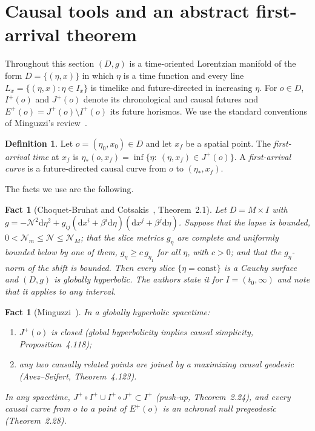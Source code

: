 \documentclass[aip,jmp,amsmath,amssymb,reprint]{revtex4-2}
\newcommand{\dd}{\mathrm{d}}
\theoremstyle{plain}
\newtheorem{fact}[proposition]{Fact}
\theoremstyle{definition}
\newtheorem{definition}[proposition]{Definition}
\begin{document}
\section{Causal tools and an abstract first-arrival theorem}
\label{sec:causal}
Throughout this section $(D,g)$ is a time-oriented Lorentzian manifold of the form
$D=\{(\eta,x)\}$ in which $\eta$ is a time function and every line
$L_x=\{(\eta,x):\eta\in I_x\}$ is timelike and future-directed in increasing $\eta$. For
$o\in D$, $I^+(o)$ and $J^+(o)$ denote its chronological and causal futures and
$E^+(o)=J^+(o)\setminus I^+(o)$ its future horismos. We use the standard
conventions of Minguzzi's review~\cite{Minguzzi2019LRR}.

\begin{definition}
Let $o=(\eta_0,x_0)\in D$ and let $x_f$ be a spatial point. The \emph{first-arrival
time} at $x_f$ is
$\eta_*(o,x_f)=\inf\{\eta:\ (\eta,x_f)\in J^+(o)\}$. A \emph{first-arrival curve} is a
future-directed causal curve from $o$ to $(\eta_*,x_f)$.
\end{definition}

The facts we use are the following.

\begin{fact}[Choquet-Bruhat and Cotsakis~\cite{ChoquetBruhatCotsakis2002}, Theorem~2.1]
\label{fact:CBC}
Let $D=M\times I$ with $g=-\mathcal N^2\dd\eta^2+g_{ij}(\dd x^i+\beta^i\dd\eta)(\dd x^j+\beta^j\dd\eta)$.
Suppose that the lapse is bounded, $0<\mathcal N_m\le\mathcal N\le\mathcal N_M$; that the
slice metrics $g_\eta$ are complete and uniformly bounded below by one of them,
$g_\eta\ge c\,g_{\eta_1}$ for all $\eta$, with $c>0$; and that the $g_\eta$-norm of the shift is
bounded. Then every slice $\{\eta=\mathrm{const}\}$ is a Cauchy surface and $(D,g)$ is
globally hyperbolic. The authors state it for $I=(t_0,\infty)$ and note that it applies
to any interval.
\end{fact}

\begin{fact}[Minguzzi~\cite{Minguzzi2019LRR}]\label{fact:minguzzi}
In a globally hyperbolic spacetime:
\begin{enumerate}
\item $J^+(o)$ is closed (global hyperbolicity implies causal simplicity,
  Proposition~4.118);
\item any two causally related points are joined by a maximizing causal geodesic
  (Avez--Seifert, Theorem~4.123).
\end{enumerate}
In any spacetime, $J^+\circ I^+\cup I^+\circ J^+\subset I^+$ (push-up,
Theorem~2.24), and every causal curve from $o$ to a point of $E^+(o)$ is an achronal
null pregeodesic (Theorem~2.28).
\end{fact}
\end{document}
